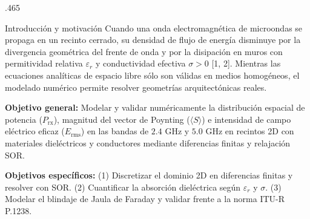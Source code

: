 \documentclass[final]{beamer}
\begin{document}
\begin{frame}[t]
\begin{columns}[t]
			\begin{column}{.465\paperwidth}
				
				\begin{block}{Introducción y motivación}
					Cuando una onda electromagnética de microondas se propaga en un recinto cerrado, su densidad de flujo de energía disminuye por la divergencia geométrica del frente de onda y por la disipación en muros con permitividad relativa \(\varepsilon_r\) y conductividad efectiva \(\sigma > 0\) [1, 2]. Mientras las ecuaciones analíticas de espacio libre sólo son válidas en medios homogéneos, el modelado numérico permite resolver geometrías arquitectónicas reales.
					
					\vspace{0.2cm}
					\textbf{Objetivo general:} Modelar y validar numéricamente la distribución espacial de potencia (\(P_{\text{rx}}\)), magnitud del vector de Poynting (\(\langle S \rangle\)) e intensidad de campo eléctrico eficaz (\(E_{\text{rms}}\)) en las bandas de \(2.4\text{ GHz}\) y \(5.0\text{ GHz}\) en recintos 2D con materiales dieléctricos y conductores mediante diferencias finitas y relajación SOR.
					
					\vspace{0.15cm}
					\textbf{Objetivos específicos:} (1) Discretizar el dominio 2D en diferencias finitas y resolver con SOR. (2) Cuantificar la absorción dieléctrica según \(\varepsilon_r\) y \(\sigma\). (3) Modelar el blindaje de Jaula de Faraday y validar frente a la norma ITU-R P.1238.
				\end{block}
				

\end{column}
\end{columns}
\end{frame}
\end{document}
